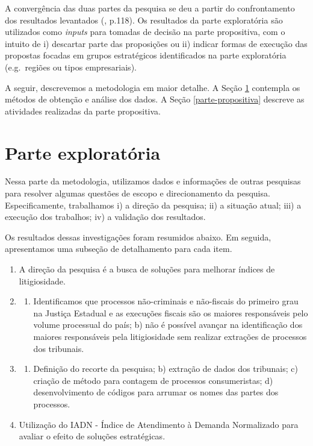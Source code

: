 \documentclass[]{report}
\providecommand{\tightlist}{%
  \setlength{\itemsep}{0pt}\setlength{\parskip}{0pt}}
\begin{document}
A convergência das duas partes da pesquisa se deu a partir do
confrontamento dos resultados levantados (\citet{creswell2013research},
p.118). Os resultados da parte exploratória são utilizados como
\emph{inputs} para tomadas de decisão na parte propositiva, com o
intuito de i) descartar parte das proposições ou ii) indicar formas de
execução das propostas focadas em grupos estratégicos identificados na
parte exploratória (e.g.~regiões ou tipos empresariais).

A seguir, descrevemos a metodologia em maior detalhe. A Seção
\ref{parte-exploratoria} contempla os métodos de obtenção e análise dos
dados. A Seção \ref{parte-propositiva} descreve as atividades realizadas
da parte propositiva.

\section{Parte exploratória}\label{parte-exploratoria}

Nessa parte da metodologia, utilizamos dados e informações de outras
pesquisas para resolver algumas questões de escopo e direcionamento da
pesquisa. Especificamente, trabalhamos i) a direção da pesquisa; ii) a
situação atual; iii) a execução dos trabalhos; iv) a validação dos
resultados.

Os resultados dessas investigações foram resumidos abaixo. Em seguida,
apresentamos uma subseção de detalhamento para cada item.

\begin{enumerate}
\def\labelenumi{\arabic{enumi}.}
\item
  A direção da pesquisa é a busca de soluções para melhorar índices de
  litigiosidade.
\item
  \begin{enumerate}
  \def\labelenumii{\alph{enumii})}
  \tightlist
  \item
    Identificamos que processos não-criminais e não-fiscais do primeiro
    grau na Justiça Estadual e as execuções fiscais são os maiores
    responsáveis pelo volume processual do país; b) não é possível
    avançar na identificação dos maiores responsáveis pela litigiosidade
    sem realizar extrações de processos dos tribunais.
  \end{enumerate}
\item
  \begin{enumerate}
  \def\labelenumii{\alph{enumii})}
  \tightlist
  \item
    Definição do recorte da pesquisa; b) extração de dados dos
    tribunais; c) criação de método para contagem de processos
    consumeristas; d) desenvolvimento de códigos para arrumar os nomes
    das partes dos processos.
  \end{enumerate}
\item
  Utilização do IADN - Índice de Atendimento à Demanda Normalizado para
  avaliar o efeito de soluções estratégicas.
\end{enumerate}
\end{document}

